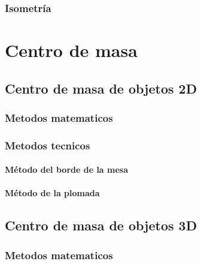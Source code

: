 \documentclass[16pt,]{krantz}
\theoremstyle{definition}
\theoremstyle{definition}
\theoremstyle{definition}
\theoremstyle{definition}
\theoremstyle{remark}
\begin{document}
\hypertarget{isometruxeda}{%
\subsection{Isometría}\label{isometruxeda}}

\hypertarget{centro-de-masa}{%
\chapter{Centro de masa}\label{centro-de-masa}}

\hypertarget{centro-de-masa-de-objetos-2d}{%
\section{Centro de masa de objetos 2D}\label{centro-de-masa-de-objetos-2d}}

\hypertarget{metodos-matematicos}{%
\subsection{Metodos matematicos}\label{metodos-matematicos}}

\hypertarget{metodos-tecnicos}{%
\subsection{Metodos tecnicos}\label{metodos-tecnicos}}

\hypertarget{muxe9todo-del-borde-de-la-mesa}{%
\subsubsection{Método del borde de la mesa}\label{muxe9todo-del-borde-de-la-mesa}}

\hypertarget{muxe9todo-de-la-plomada}{%
\subsubsection{Método de la plomada}\label{muxe9todo-de-la-plomada}}

\hypertarget{centro-de-masa-de-objetos-3d}{%
\section{Centro de masa de objetos 3D}\label{centro-de-masa-de-objetos-3d}}

\hypertarget{metodos-matematicos-1}{%
\subsection{Metodos matematicos}\label{metodos-matematicos-1}}
\end{document}
